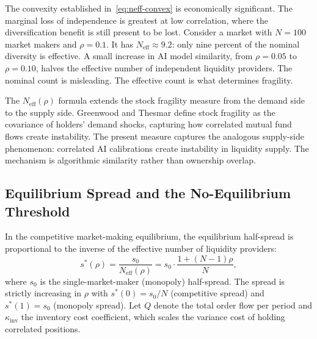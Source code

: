 The convexity established in~\eqref{eq:neff-convex} is economically significant. The marginal loss of independence is greatest at low correlation, where the diversification benefit is still present to be lost. Consider a market with $N = 100$ market makers and $\rho = 0.1$. It has $N_{\text{eff}} \approx 9.2$: only nine percent of the nominal diversity is effective. A small increase in AI model similarity, from $\rho = 0.05$ to $\rho = 0.10$, halves the effective number of independent liquidity providers. The nominal count is misleading. The effective count is what determines fragility.

The $N_{\text{eff}}(\rho)$ formula extends the \citet{greenwood2011} stock fragility measure from the demand side to the supply side. Greenwood and Thesmar define stock fragility as the covariance of holders' demand shocks, capturing how correlated mutual fund flows create instability. The present measure captures the analogous supply-side phenomenon: correlated AI calibrations create instability in liquidity supply. The mechanism is algorithmic similarity rather than ownership overlap.

\subsection{Equilibrium Spread and the No-Equilibrium Threshold}

In the competitive market-making equilibrium, the equilibrium half-spread is proportional to the inverse of the effective number of liquidity providers:
\begin{equation}\label{eq:spread}
  s^*(\rho) = \frac{s_0}{N_{\text{eff}}(\rho)} = s_0 \cdot \frac{1+(N-1)\rho}{N},
\end{equation}
where $s_0$ is the single-market-maker (monopoly) half-spread. The spread is strictly increasing in $\rho$ with $s^*(0) = s_0/N$ (competitive spread) and $s^*(1) = s_0$ (monopoly spread). Let $Q$ denote the total order flow per period and $\kappa_{\text{inv}}$ the inventory cost coefficient, which scales the variance cost of holding correlated positions.

